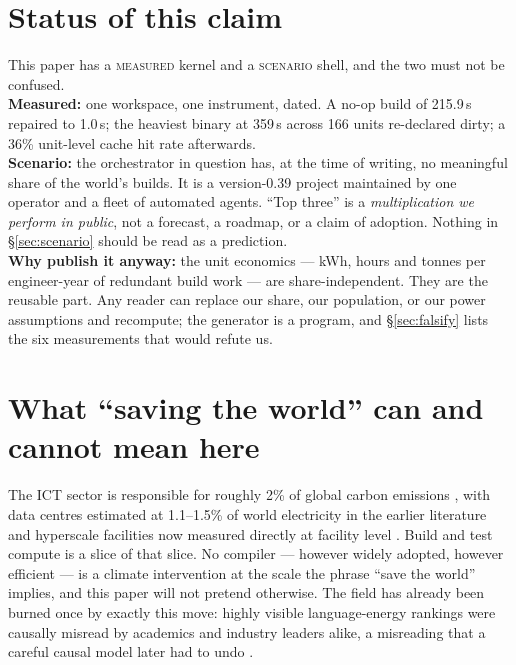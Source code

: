 \documentclass[11pt,a4paper]{article}
\providecommand{\textcite}[1]{\cite{#1}}
\newcommand{\brief}[3]{\begin{tcolorbox}[colback=panelbg,colframe=#1,boxrule=0.8pt,arc=2pt,title=\textbf{#2},coltitle=white,colbacktitle=#1]#3\end{tcolorbox}}
\begin{document}
\section{Status of this claim}\label{sec:status}


\brief{sigilred}{Read this before any number}{This paper has a \textsc{measured} kernel and a \textsc{scenario} shell, and the two must not be confused.\\[4pt]
\textbf{Measured:} one workspace, one instrument, dated. A no-op build of 215.9\,s repaired to 1.0\,s; the heaviest binary at 359\,s across 166 units re-declared dirty; a 36\% unit-level cache hit rate afterwards.\\[4pt]
\textbf{Scenario:} the orchestrator in question has, at the time of writing, no meaningful share of the world's builds. It is a version-0.39 project maintained by one operator and a fleet of automated agents. ``Top three'' is a \emph{multiplication we perform in public}, not a forecast, a roadmap, or a claim of adoption. Nothing in \S\ref{sec:scenario} should be read as a prediction.\\[4pt]
\textbf{Why publish it anyway:} the unit economics --- kWh, hours and tonnes per engineer-year of redundant build work --- are share-independent. They are the reusable part. Any reader can replace our share, our population, or our power assumptions and recompute; the generator is a program, and \S\ref{sec:falsify} lists the six measurements that would refute us.}


\section{What ``saving the world'' can and cannot mean here}\label{sec:frame}


The ICT sector is responsible for roughly 2\% of global carbon emissions \textcite{arxiv2407_19901}, with data centres estimated at 1.1--1.5\% of world electricity in the earlier literature \textcite{arxiv1307_7037,arxiv2309_09241} and hyperscale facilities now measured directly at facility level \textcite{arxiv2606_05420}. Build and test compute is a slice of that slice. No compiler --- however widely adopted, however efficient --- is a climate intervention at the scale the phrase ``save the world'' implies, and this paper will not pretend otherwise. The field has already been burned once by exactly this move: highly visible language-energy rankings were causally misread by academics and industry leaders alike, a misreading that a careful causal model later had to undo \textcite{arxiv2410_05460}.
\end{document}
